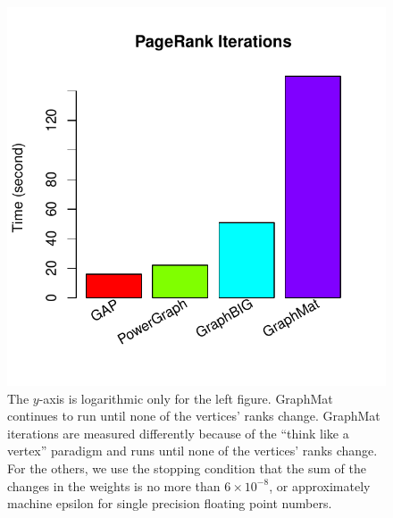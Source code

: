 \documentclass{llncs}
\begin{document}
\begin{figure}
\begin{minipage}{0.48\linewidth}
		\includegraphics[width=\linewidth, trim=0 18pt 18pt 0, clip]{graphics/pr_iters.pdf}
	\end{minipage}
	\caption{The $y$-axis is logarithmic only for the left figure. GraphMat continues to run until none of the vertices' ranks change. GraphMat iterations are measured differently because of the ``think like a vertex'' paradigm and runs until none of the vertices' ranks change. For the others, we use the stopping condition that the sum of the changes in the weights is no more than $6 \times 10^{-8}$, or approximately machine epsilon for single precision floating point numbers.}
	\label{fig:pr}
\end{figure}
\end{document}
